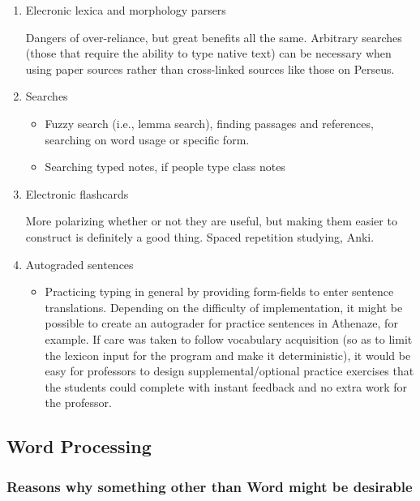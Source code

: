 \documentclass[11pt]{article}
\begin{document}
\begin{enumerate}
\item Elecronic lexica and morphology parsers
\label{sec:orgbd6750f}

Dangers of over-reliance, but great benefits all the same. Arbitrary searches (those that require the ability to type native text) can be necessary when using paper sources rather than cross-linked sources like those on Perseus.

\item Searches
\label{sec:org5a57112}

\begin{itemize}
\item Fuzzy search (i.e., lemma search), finding passages and references, searching on word usage or specific form.
\item Searching typed notes, if people type class notes
\end{itemize}

\item Electronic flashcards
\label{sec:org69a59ff}

More polarizing whether or not they are useful, but making them easier to construct is definitely a good thing. Spaced repetition studying, Anki.

\item Autograded sentences
\label{sec:orgefbcf06}

\begin{itemize}
\item Practicing typing in general by providing form-fields to enter sentence translations. Depending on the difficulty of implementation, it might be possible to create an autograder for practice sentences in Athenaze, for example. If care was taken to follow vocabulary acquisition (so as to limit the lexicon input for the program and make it deterministic), it would be easy for professors to design supplemental/optional practice exercises that the students could complete with instant feedback and no extra work for the professor.
\end{itemize}
\end{enumerate}

\subsection{Word Processing}
\label{sec:org19de905}

\subsubsection{Reasons why something other than Word might be desirable}
\label{sec:org5c96b63}
\end{document}
